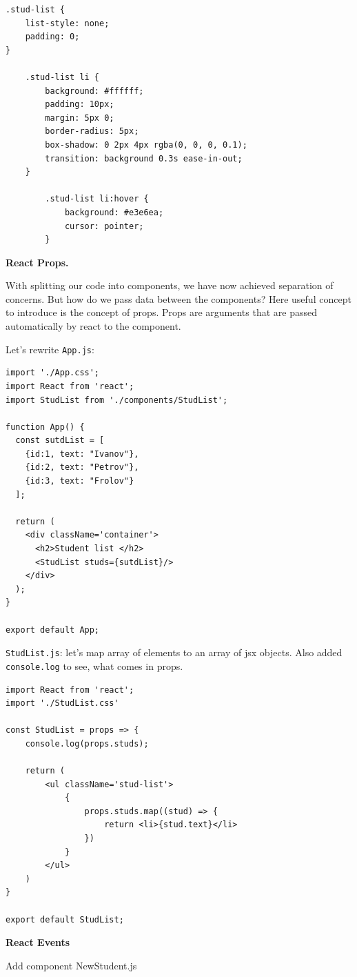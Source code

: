 \begin{lstlisting}
.stud-list {
    list-style: none;
    padding: 0;
}

    .stud-list li {
        background: #ffffff;
        padding: 10px;
        margin: 5px 0;
        border-radius: 5px;
        box-shadow: 0 2px 4px rgba(0, 0, 0, 0.1);
        transition: background 0.3s ease-in-out;
    }

        .stud-list li:hover {
            background: #e3e6ea;
            cursor: pointer;
        }
\end{lstlisting}

\medskip
\textbf{React Props.}

With splitting our code into components, we have now achieved separation of concerns. But how do we pass data between the components?
Here useful concept to introduce is the concept of props. Props are arguments that are passed automatically by react to the component.

Let's rewrite \verb"App.js":

\begin{lstlisting}
import './App.css';
import React from 'react';
import StudList from './components/StudList';

function App() {
  const sutdList = [
    {id:1, text: "Ivanov"},
    {id:2, text: "Petrov"},
    {id:3, text: "Frolov"}
  ];

  return (
    <div className='container'>
      <h2>Student list </h2>
      <StudList studs={sutdList}/>
    </div>
  );
}

export default App;
\end{lstlisting}

\verb"StudList.js": let's map array of elements to an array of jsx objects. Also added \verb"console.log" to see, what comes in props.

\begin{lstlisting}
import React from 'react';
import './StudList.css'

const StudList = props => {
    console.log(props.studs);

    return (
        <ul className='stud-list'>
            {
                props.studs.map((stud) => {
                    return <li>{stud.text}</li>
                })
            }
        </ul>
    )
}

export default StudList;
\end{lstlisting}

\medskip
\textbf{React Events}

Add component NewStudent.js

